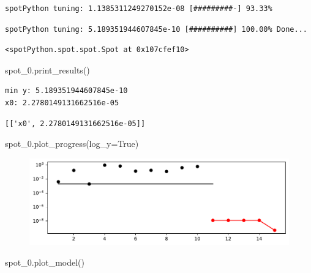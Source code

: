 \documentclass[
  letterpaper,
  DIV=11,
  numbers=noendperiod]{scrreprt}
\newenvironment{Shaded}{\begin{snugshade}}{\end{snugshade}}
\newcommand{\NormalTok}[1]{\textcolor[rgb]{0.00,0.23,0.31}{#1}}
\newcommand{\OperatorTok}[1]{\textcolor[rgb]{0.37,0.37,0.37}{#1}}
\newcommand{\VariableTok}[1]{\textcolor[rgb]{0.07,0.07,0.07}{#1}}
\begin{document}
\begin{verbatim}
spotPython tuning: 1.1385311249270152e-08 [#########-] 93.33% 
\end{verbatim}

\begin{verbatim}
spotPython tuning: 5.189351944607845e-10 [##########] 100.00% Done...
\end{verbatim}

\begin{verbatim}
<spotPython.spot.spot.Spot at 0x107cfef10>
\end{verbatim}

\begin{Shaded}
\begin{Highlighting}[]
\NormalTok{spot\_0.print\_results()}
\end{Highlighting}
\end{Shaded}

\begin{verbatim}
min y: 5.189351944607845e-10
x0: 2.2780149131662516e-05
\end{verbatim}

\begin{verbatim}
[['x0', 2.2780149131662516e-05]]
\end{verbatim}

\begin{Shaded}
\begin{Highlighting}[]
\NormalTok{spot\_0.plot\_progress(log\_y}\OperatorTok{=}\VariableTok{True}\NormalTok{)}
\end{Highlighting}
\end{Shaded}

\begin{figure}[H]

{\centering \includegraphics{007_num_spot_intro_files/figure-pdf/cell-8-output-1.pdf}

}

\end{figure}

\begin{Shaded}
\begin{Highlighting}[]
\NormalTok{spot\_0.plot\_model()}
\end{Highlighting}
\end{Shaded}
\end{document}
